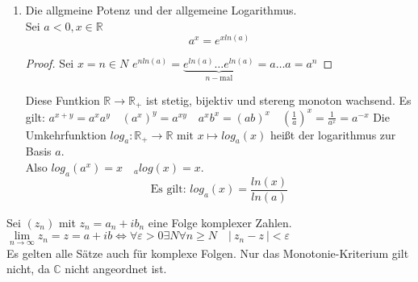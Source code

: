 \documentclass[a4paper,titlepage,oneside]{article}
\def\C{\ensuremath{\mathbb{C}} }
\def\R{\ensuremath{\mathbb{R}} }
\def\im{\ensuremath{\mathit{i}} }
\renewcommand{\epsilon}{\ensuremath{\varepsilon} }
\renewcommand{\liminf}[2][n]{\ensuremath{\lim\limits_{#1 \rightarrow \infty}{#2}}}
\newcommand{\abs}[1]{\ensuremath{\left|\:#1\:\right|}}
\theoremstyle{thmstyle}
\begin{document}
\begin{bsp}
\begin{enumerate}
\begin{proof}
	Also $\liminf{exp(x)} = \infty$ und $\liminf{exp(x)} = 0$
	Es gibt daher eine stetige Umkehrfunktion $ ln : \R_+ \to  \R \text{ mit } x \mapsto ln(x)$ der natürliche Logarithmus.
	$ln$ ist wieder stetig und streng monoton wachsend.
\end{proof}
\[\text{Es gilt: } ln(x y) = ln(x) + ln(y)\]
	\begin{proof}
	$ ln(x) = \xi$ und $ ln(y) = \eta$\\
	d.h. $ e^{\xi} = x $ und $ e^{\eta} = y$\\
	$\Rightarrow e^{\xi + \eta} = e^{\xi} e^{\eta} = x y \qquad | ln \\
	\Rightarrow ln(e^{\xi + \eta}) = ln(xy) \\
	\Rightarrow \xi + \eta = ln(xy) \\
	\Rightarrow ln(x) + ln(y) = ln(xy)$
	\end{proof}
\item Die allgmeine Potenz und der allgemeine Logarithmus.\\
Sei $ a < 0, x \in \R$ \[a^x = e^{x ln(a)}\]
\begin{proof}
Sei $x = n \in N$
$e^{n ln(a)} = \underbrace{e^{ln(a)} \dots e^{ln(a)}}_{n-\text{mal}} = a\dots a = a ^n$
\end{proof}
Diese Funtkion $\R \to \R_+$ ist stetig, bijektiv und stereng monoton wachsend.
Es gilt: $a^{x+y} = a^x a^y \quad (a^x)^y = a^{xy} \quad a^x b^x = (ab)^x \quad (\frac{1}{a})^x = \frac{1}{a^x} = a^{-x}$
Die Umkehrfunktion $log_a : \R_+ \to \R \text{ mit } x \mapsto log_a(x)$ heißt der logarithmus zur Basis $a$.\\
Also $log_a(a^x) = x \quad _alog(x) = x.$
\[\text{Es gilt: } log_a(x) = \frac{ln(x)}{ln(a)}\]
\end{enumerate}
\end{bsp}

\begin{defi}
Sei $(z_n)$ mit $z_n = a_n + \im b_n$ eine Folge komplexer Zahlen. \\
$\liminf{z_n} = z = a+\im b \Leftrightarrow \forall \epsilon > 0 \exists N  \forall n \ge N \quad \abs{z_n - z} < \epsilon $\\
Es gelten alle Sätze auch für komplexe Folgen. Nur das Monotonie-Kriterium gilt nicht, da \C nicht angeordnet ist.
\end{defi}
\end{document}
